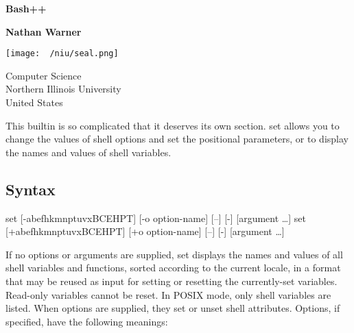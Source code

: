 \documentclass{report}
\title{\Huge{}}
\author{\huge{Nathan Warner}}
\date{\huge{}}
\begin{document}
        \begin{titlepage}
       \begin{center}
           \vspace*{1cm}
    
           \textbf{Bash++}
    
           \vspace{0.5cm}
            
                
           \vspace{1.5cm}
    
           \textbf{Nathan Warner}
    
           \vfill
                
                
           \vspace{0.8cm}
         
           \texttt{[image: ~/niu/seal.png]}
                
           Computer Science \\
           Northern Illinois University\\
           United States\\
           
                
       \end{center}
    \end{titlepage}
    \tableofcontents
    \pagebreak 
    \bigbreak \noindent 
    This builtin is so complicated that it deserves its own section. set allows you to change the values of shell options and set the positional parameters, or to display the names and values of shell variables.
    \bigbreak \noindent 
    \subsection{Syntax}
    \bigbreak \noindent 
    \begin{bashcode}
        set [-abefhkmnptuvxBCEHPT] [-o option-name] [--] [-] [argument …]
        set [+abefhkmnptuvxBCEHPT] [+o option-name] [--] [-] [argument …]
    \end{bashcode}
    \bigbreak \noindent 
    If no options or arguments are supplied, set displays the names and values of all shell variables and functions, sorted according to the current locale, in a format that may be reused as input for setting or resetting the currently-set variables. Read-only variables cannot be reset. In POSIX mode, only shell variables are listed.
    \bigbreak \noindent 
    When options are supplied, they set or unset shell attributes. Options, if specified, have the following meanings:
\end{document}
